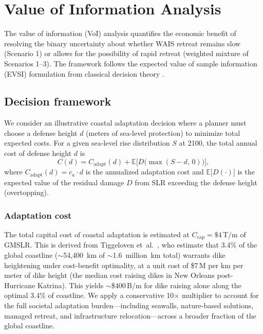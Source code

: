 \documentclass[12pt]{article}
\begin{document}
\section{Value of Information Analysis}
\label{sec:voi}

The value of information (VoI) analysis quantifies the economic benefit of resolving the binary uncertainty about whether WAIS retreat remains slow (Scenario 1) or allows for the possibility of rapid retreat (weighted mixture of Scenarios 1--3). The framework follows the expected value of sample information (EVSI) formulation from classical decision theory \citep{Raiffa1961}.

\subsection{Decision framework}

We consider an illustrative coastal adaptation decision where a planner must choose a defense height $d$ (meters of sea-level protection) to minimize total expected costs. For a given sea-level rise distribution $S$ at 2100, the total annual cost of defense height $d$ is
\begin{equation}
C(d) = C_{\mathrm{adapt}}(d) + \mathbb{E}\bigl[D\bigl(\max(S - d,\, 0)\bigr)\bigr],
\label{eq:total_cost}
\end{equation}
where $C_{\mathrm{adapt}}(d) = c_a \cdot d$ is the annualized adaptation cost and $\mathbb{E}\bigl[D(\cdot)\bigr]$ is the expected value of the residual damage $D$ from SLR exceeding the defense height (overtopping).

\subsubsection{Adaptation cost}
\label{s:adaptation_cost}

The total capital cost of coastal adaptation is estimated at $C_{\mathrm{cap}} = \$4$\,T/m of GMSLR. This is derived from Tiggeloven et~al.~\citep{Tiggeloven2020}, who estimate that 3.4\% of the global coastline ($\sim$54{,}400~km of $\sim$1.6~million~km total) warrants dike heightening under cost-benefit optimality, at a unit cost of \$7\,M per km per meter of dike height (the median cost raising dikes in New Orleans post-Hurricane Katrina). This yields $\sim$\$400\,B/m for dike raising alone along the optimal 3.4\% of coastline. We apply a conservative 10$\times$ multiplier to account for the full societal adaptation burden---including seawalls, nature-based solutions, managed retreat, and infrastructure relocation---across a broader fraction of the global coastline.
\end{document}
